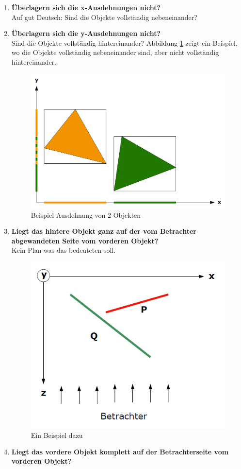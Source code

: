 \begin{enumerate}
	\item \textbf{Überlagern sich die x-Ausdehnungen nicht?} \\
	Auf gut Deutsch: Sind die Objekte vollständig nebeneinander?
	\item \textbf{Überlagern sich die y-Ausdehnungen nicht?} \\
	Sind die Objekte vollständig hintereinander? Abbildung \ref{fig:ausdehnungen} zeigt ein Beispiel, wo die Objekte vollständig nebeneinander sind, aber nicht vollständig hintereinander.
		\begin{figure}[!ht]
			\centering
			\includegraphics[width=0.5\linewidth]{fig/ausdehnungen}
			\caption{Beispiel Ausdehnung von 2 Objekten}
			\label{fig:ausdehnungen}
		\end{figure}
	\item \textbf{Liegt das hintere Objekt ganz auf der vom Betrachter abgewandeten Seite vom vorderen Objekt?} \\
	Kein Plan was das bedeuteten soll.
		\begin{figure}[!ht]
			\centering
			\includegraphics[width=0.5\linewidth]{fig/tiefensortierung_3}
			\caption{Ein Beispiel dazu}
			\label{fig:tiefensortierung_3}
		\end{figure}
	\item \textbf{Liegt das vordere Objekt komplett auf der Betrachterseite vom vorderen Objekt?}\\
		\begin{figure}[!ht]

\end{figure}
\end{enumerate}
